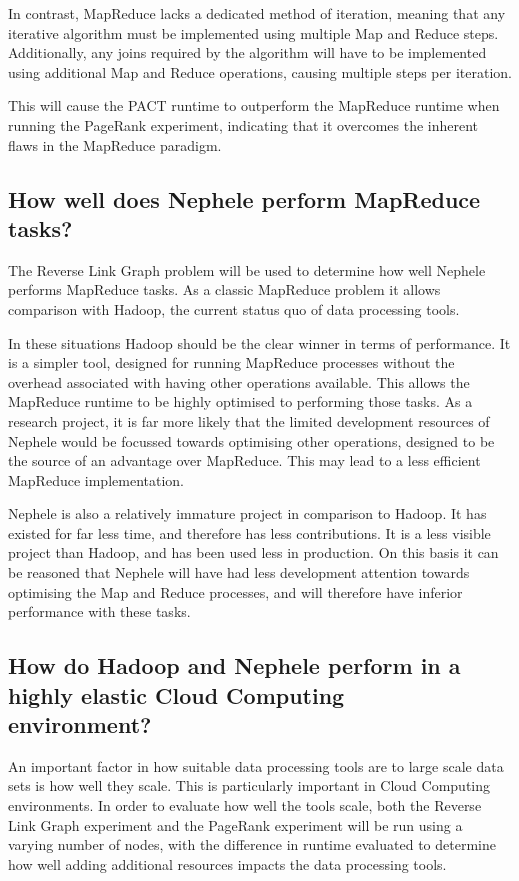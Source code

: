 In contrast, MapReduce lacks a dedicated method of iteration, meaning that any iterative algorithm must be implemented using multiple Map and Reduce steps. Additionally, any joins required by the algorithm will have to be implemented using additional Map and Reduce operations, causing multiple steps per iteration.

This will cause the PACT runtime to outperform the MapReduce runtime when running the PageRank experiment, indicating that it overcomes the inherent flaws in the MapReduce paradigm.

\tocless\subsection{How well does Nephele perform MapReduce tasks?}
The Reverse Link Graph problem will be used to determine how well Nephele performs MapReduce tasks. As a classic MapReduce problem it allows comparison with Hadoop, the current status quo of data processing tools.

In these situations Hadoop should be the clear winner in terms of performance. It is a simpler tool, designed for running MapReduce processes without the overhead associated with having other operations available. This allows the MapReduce runtime to be highly optimised to performing those tasks. As a research project, it is far more likely that the limited development resources of Nephele would be focussed towards optimising other operations, designed to be the source of an advantage over MapReduce. This may lead to a less efficient MapReduce implementation. 

Nephele is also a relatively immature project in comparison to Hadoop. It has existed for far less time, and therefore has less contributions. It is a less visible project than Hadoop, and has been used less in production. On this basis it can be reasoned that Nephele will have had less development attention towards optimising the Map and Reduce processes, and will therefore have inferior performance with these tasks.

\tocless\subsection{How do Hadoop and Nephele perform in a highly elastic Cloud Computing \\ environment?}
An important factor in how suitable data processing tools are to large scale data sets is how well they scale. This is particularly important in Cloud Computing environments. In order to evaluate how well the tools scale, both the Reverse Link Graph experiment and the PageRank experiment will be run using a varying number of nodes, with the difference in runtime evaluated to determine how well adding additional resources impacts the data processing tools. 

